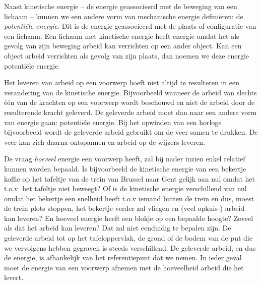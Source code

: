 \documentclass{ximera}
\begin{document}
	\author{Bart Lambregs}



	Naast kinetische energie -- de energie geassocieerd met de beweging van een lichaam -- kunnen we een andere vorm van mechanische energie definiëren: de \textit{potentiële energie}. Dit is de energie geassocieerd met de plaats of configuratie van een lichaam. Een lichaam met kinetische energie heeft energie omdat het als gevolg van zijn beweging arbeid kan verrichten op een ander object. Kan een object arbeid verrichten als gevolg van zijn plaats, dan noemen we deze energie potentiële energie.
	
	Het leveren van arbeid op een voorwerp hoeft niet altijd te resulteren in een verandering van de kinetische energie. Bijvoorbeeld wanneer de arbeid van slechts \'e\'en van de krachten op een voorwerp wordt beschouwd en niet de arbeid door de resulterende kracht geleverd. De geleverde arbeid moet dan naar een andere vorm van energie gaan: potentiële energie. Bij het opwinden van een horloge bijvoorbeeld wordt de geleverde arbeid gebruikt om de veer samen te drukken. De veer kan zich daarna ontspannen en arbeid op de wijzers leveren.
	
	De vraag \textit{hoeveel} energie een voorwerp heeft, zal bij nader inzien enkel relatief kunnen worden bepaald. Is bijvoorbeeld de kinetische energie van een bekertje koffie op het tafeltje van de trein van Brussel naar Gent gelijk aan nul omdat het t.o.v. het tafeltje niet beweegt? Of is de kinetische energie verschillend van nul omdat het bekertje een snelheid heeft t.o.v iemand buiten de trein en dus, moest de trein plots stoppen, het bekertje verder zal vliegen en (veel opkuis-) arbeid kan leveren? En hoeveel energie heeft een blokje op een bepaalde hoogte? Zoveel als dat het arbeid kan leveren? Dat zal niet eenduidig te bepalen zijn. De geleverde arbeid tot op het tafeloppervlak, de grond of de bodem van de put die we vervolgens hebben gegraven is steeds verschillend. De geleverde arbeid, en dus de energie, is afhankelijk van het referentiepunt dat we nemen. In ieder geval moet de energie van een voorwerp afnemen met de hoeveelheid arbeid die het levert.
	
	
\end{document}
